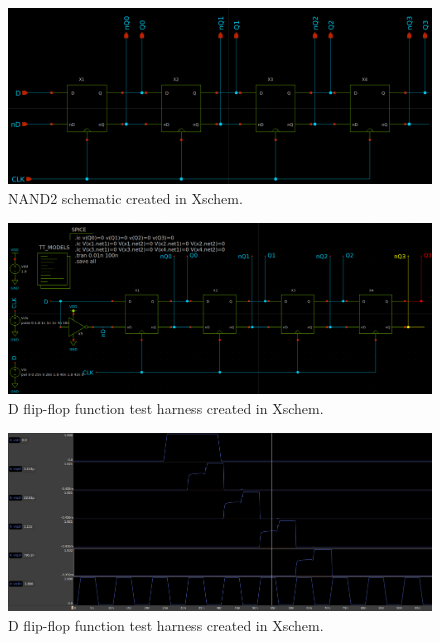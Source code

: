 \documentclass[11pt]{article}
\begin{document}
    \begin{figure}[!ht]
        \includegraphics[width=\linewidth]{../img/sreg_sch.png}
        \caption{NAND2 schematic created in Xschem.}
        \label{fig:shiftreg}
    \end{figure}
    \begin{figure}[!ht]
        \includegraphics[width=\linewidth]{../img/sreg_test_hardness.png}
        \caption{D flip-flop function test harness created in Xschem.}
        \label{fig:sreg_test}
    \end{figure}
    \begin{figure}[!ht]
        \centering
        \includegraphics[width=1.2\linewidth, angle=90]{../img/sreg_test.png}
        \caption{D flip-flop function test harness created in Xschem.}
        \label{fig:sreg_test_out}
    \end{figure}
    

\FloatBarrier
\end{document}
